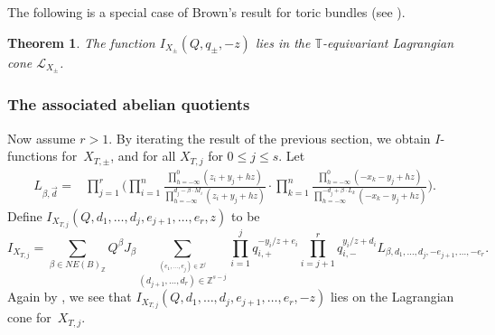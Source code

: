\documentclass[pdftex]{sigma}
\newtheorem{Theorem}{Theorem}[section]
\numberwithin{equation}{section}
\newcommand{\cc}[1]{\mathcal{#1}} %
\newcommand{\ZZ}{\mathbb{Z}}
\newcommand{\torus}{\mathbb{T}}
\newcommand{\MB}{M}
\newcommand{\LB}{L}
\newcommand{\z}{z}
\newcommand{\x}{x}
\newcommand{\y}{y}
\begin{document}
The following is a special case of Brown's result for toric bundles (see \cite{Brown}).
\begin{Theorem}
The function $I_{X_\pm}(Q, q_\pm, -z)$ lies in the $\torus$-equivariant Lagrangian cone $\cc L_{X_\pm}$.
\end{Theorem}

\subsubsection{The associated abelian quotients}
Now assume $r > 1$. By iterating the result of the previous section, we obtain $I$-functions for~$X_{T, \pm}$, and for all $X_{T, j}$ for $0 \leq j \leq s$.
Let
\begin{align*}
	L_{\beta,\vec{d}}={}& \prod_{j=1}^r \Biggl(\prod_{i=1}^n \frac{\prod_{h=-\infty}^0 (\z_i+\y_j+hz)}{\prod_{h=-\infty}^{d_j-\beta\cdot \MB_i} (\z_i+\y_j+hz)}
	\cdot \prod_{k=1}^{n}\frac{\prod_{h=-\infty}^{0}(-\x_k -\y_j+hz)}{\prod_{h=-\infty}^{-d_j+\beta\cdot \LB_k}(-\x_k -\y_j+hz)}\Biggr).
\end{align*}
Define $I_{X_{T, j}} (Q, d_1, \dots, d_j, e_{j+1}, \dots, e_r, z)$ to be
\begin{equation*} I_{X_{T, j}} =
\sum_{\beta \in NE(B)_\ZZ} Q^\beta J_\beta \sum_{\stackrel{(e_1, \dots, e_j) \in \ZZ^j}{ (d_{j+1}, \dots, d_r) \in \ZZ^{s-j}}} \prod_{i=1}^j q_{i, +}^{-\y_i/z+e_i}\prod_{i=j+1}^r q_{i, -}^{\y_i/z+d_i}
L_{\beta, d_1, \dots, d_j, -e_{j+1}, \dots, -e_r}.
\end{equation*}
Again by \cite{Brown}, we see that $I_{X_{T, j}} (Q, d_1, {\dots}, d_j, e_{j+1}, {\dots}, e_r, -z)$ lies on the Lagrangian cone for~$X_{T, j}$.
\end{document}
